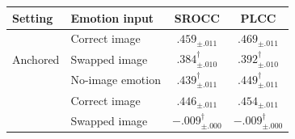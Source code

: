 \begin{tabular}{ll cc}
\toprule
Setting & Emotion input & SROCC & PLCC \\
\midrule
\multirow{3}{*}{Anchored} & Correct image & $\bm{.459_{\pm .011}}$ & $\bm{.469_{\pm .011}}$ \\
& Swapped image & $.384_{\pm .010}^{\dagger}$ & $.392_{\pm .010}^{\dagger}$ \\
& No-image emotion & $.439_{\pm .011}^{\dagger}$ & $.449_{\pm .011}^{\dagger}$ \\
\addlinespace
\multirow{2}{*}{Unanchored} & Correct image & $\bm{.446_{\pm .011}}$ & $\bm{.454_{\pm .011}}$ \\
& Swapped image & $-.009_{\pm .000}^{\dagger}$ & $-.009_{\pm .000}^{\dagger}$ \\
\bottomrule
\end{tabular}

